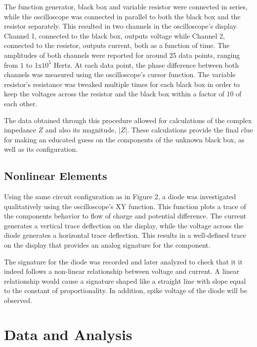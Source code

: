 \documentclass[a4paper]{article}
\begin{document}
The function generator, black box and variable resistor were connected in series, while the oscilloscope was connected in parallel to both the black box and the resistor separately. This resulted in two channels in the oscilloscope's display. Channel 1, connected to the black box, outputs voltage while Channel 2, connected to the resistor, outputs current, both as a function of time. The amplitudes of both channels were reported for around 25 data points, ranging from $1$ to 1x$10^{5}$ Hertz. At each data point, the phase difference between both channels was measured using the oscilloscope's cursor function. The variable resistor's resistance was tweaked multiple times for each black box in order to keep the voltages across the resistor and the black box within a factor of 10 of each other. 

The data obtained through this procedure allowed for calculations of the complex impedance $Z$ and also its magnitude, $|Z|$. These calculations provide the final clue for making an educated guess on the components of the unknown black box, as well as its configuration.

\subsection{Nonlinear Elements}

Using the same circuit configuration as in Figure 2, a diode was investigated qualitatively using the oscilloscope's XY function. This function plots a trace of the components behavior to flow of charge and potential difference. The current generates a vertical trace deflection on the display, while the voltage across the diode generates a horizontal trace deflection. This results in a well-defined trace on the display that provides an analog signature for the component.

The signature for the diode was recorded and later analyzed to check that it it indeed follows a non-linear relationship between voltage and current. A linear relationship would cause a signature shaped like a straight line with slope equal to the constant of proportionality. In addition, spike voltage of the diode will be observed.

\section{Data and Analysis}
\end{document}

